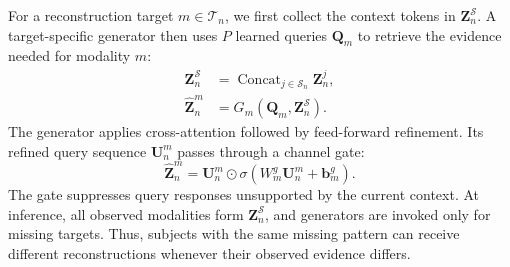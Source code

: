 \documentclass[a4paper,fleqn]{cas-dc}
\begin{document}
For a reconstruction target \(m\in\mathcal T_n\), we first collect the context tokens in \(\mathbf Z_n^{\mathcal S}\). A target-specific generator then uses \(P\) learned queries \(\mathbf Q_m\) to retrieve the evidence needed for modality \(m\):
\begin{equation}
\begin{aligned}
\mathbf Z_n^{\mathcal S}
  &=\operatorname{Concat}_{j\in\mathcal S_n}\mathbf Z_n^j,\\
\widehat{\mathbf Z}_n^m
  &=G_m\!\left(\mathbf Q_m,\mathbf Z_n^{\mathcal S}\right).
\end{aligned}
\label{eq:generator}
\end{equation}
The generator applies cross-attention followed by feed-forward refinement. Its refined query sequence \(\mathbf U_n^m\) passes through a channel gate:
\begin{equation}
\widehat{\mathbf Z}_n^m
=\mathbf U_n^m\odot
\sigma\!\left(W_m^g\mathbf U_n^m+\mathbf b_m^g\right).
\label{eq:channel_gate}
\end{equation}
The gate suppresses query responses unsupported by the current context. At inference, all observed modalities form \(\mathbf Z_n^{\mathcal S}\), and generators are invoked only for missing targets. Thus, subjects with the same missing pattern can receive different reconstructions whenever their observed evidence differs.
\end{document}
